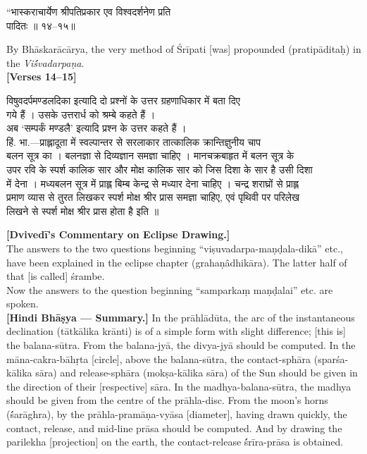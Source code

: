 \documentclass[11pt,a4paper]{article}
\newcommand{\dev}[1]{{\devanagarifont #1}}
\newcommand{\bilingualpair}[2]{%
  \noindent%
  \begin{minipage}[t]{0.48\textwidth}
    #1%
  \end{minipage}%
  \hfill%
  \begin{minipage}[t]{0.48\textwidth}
    #2%
  \end{minipage}%
  \par\vspace{0.5em}%
}
\newenvironment{sanskritcol}{\devanagarifont\small}{}
\newenvironment{englishcol}{\iastfont\small}{}
\begin{document}
\vspace{0.3cm}
\bilingualpair{%
\begin{sanskritcol}
\dev{``भास्कराचार्येण श्रीपतिप्रकार एव विश्वदर्शनेण प्रति}\\[0.3em]
\dev{पादितः ॥ १४--१५॥}
\end{sanskritcol}%
}{%
\begin{englishcol}
By Bhāskarācārya, the very method of Śrīpati [was] propounded (pratipāditaḥ) in the \textit{Vi\'śvadarpaṇa}.\\[0.3em]
\hfill \textbf{[Verses 14--15]}
\end{englishcol}%
}

\vspace{0.5cm}
\bilingualpair{%
\begin{sanskritcol}
\dev{विषुवदर्पमण्डलदिका इत्यादि दो प्रश्नों के उत्तर ग्रहणाधिकार में बता दिए}\\[0.3em]
\dev{गये हैं । उसके उत्तरार्ध को श्रम्बे कहते हैं ।}\\[0.3em]
\dev{अब `सम्पर्कं मण्डलै' इत्यादि प्रश्न के उत्तर कहते हैं ।}\\[0.3em]
\dev{हिं. भा.---प्राह्लादूता में स्वल्पान्तर से सरलाकार तात्कालिक क्रान्तिज्ञुनीय चाप}\\[0.3em]
\dev{बलन सूत्र का । बलनज्ञा से दिव्यज्ञान समज्ञा चाहिए । मानचक्रबाहृत में बलन सूत्र के}\\[0.3em]
\dev{उपर रवि के स्पर्श कालिक सार और मोक्ष कालिक सार को जिस दिशा के सार है उसी दिशा}\\[0.3em]
\dev{में देना । मध्यबलन सूत्र में प्राह्ल बिम्ब केन्द्र से मध्यार देना चाहिए । चन्द्र शराघ्रों से प्राह्ल}\\[0.3em]
\dev{प्रमाण व्यास से तुरत लिखकर स्पर्श मोक्ष श्रीर प्रास समज्ञा चाहिए, एवं पृथिवी पर परिलेख}\\[0.3em]
\dev{लिखने से स्पर्श मोक्ष श्रीर प्रास होता है इति ॥}
\end{sanskritcol}%
}{%
\begin{englishcol}
\textbf{[Dvivedī's Commentary on Eclipse Drawing.]}\\[0.3em]
The answers to the two questions beginning ``viṣuvadarpa-\-maṇḍala-dikā'' etc., have been explained in the eclipse chapter (grahaṇâdhikāra). The latter half of that [is called] \'srambe.\\[0.3em]
Now the answers to the question beginning ``samparkaṃ maṇḍalai'' etc. are spoken.\\[0.3em]
\textbf{[Hindi Bhāṣya --- Summary.]} In the prāhlādūta, the arc of the instantaneous declination (tātkālika krānti) is of a simple form with slight difference; [this is] the balana-sūtra. From the balana-jyā, the divya-jyā should be computed. In the māna-cakra-bāhṛta [circle], above the balana-sūtra, the contact-sphāra (sparśa-kālika sāra) and release-sphāra (mokṣa-kālika sāra) of the Sun should be given in the direction of their [respective] sāra. In the madhya-balana-sūtra, the madhya should be given from the centre of the prāhla-disc. From the moon's horns (\'śarāghra), by the prāhla-pramāṇa-vyāsa [diameter], having drawn quickly, the contact, release, and mid-line prāsa should be computed. And by drawing the parilekha [projection] on the earth, the contact-release \'śrīra-prāsa is obtained.

\end{englishcol}}
\end{document}
